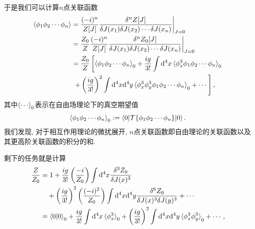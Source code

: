于是我们可以计算$n$点关联函数
\begin{align}
    \braket{\phi_1\phi_2\cdots\phi_n}&=\frac{(-i)^n}{Z[J]}\frac{\delta^n Z[J]}{\delta J(x_1)\delta J(x_2)\cdots\delta J(x_n)}\bigg|_{J=0}\\
    &=\frac{Z_0}{Z}\frac{(-i)^n}{Z[J]}\frac{\delta^n Z_0[J]}{\delta J(x_1)\delta J(x_2)\cdots\delta J(x_n)}\bigg|_{J=0}\\
    &=\frac{Z_0}{Z}\left[\braket{\phi_1\phi_2\cdots\phi_n}_0+\frac{ig}{3!}\int\mathrm d^4x\braket{\phi_x^3\phi_1\phi_2\cdots\phi_n}_0\right.\notag\\
    &\;\left.+\left(\frac{ig}{3!}\right)^2\int\mathrm d^4x\mathrm d^4y\braket{\phi_x^3\phi_y^3\phi_1\phi_2\cdots\phi_n}_0+\cdots\right],
\end{align}
其中$\braket{\cdots}_0$表示在自由场理论下的真空期望值
\begin{equation}
    \braket{\phi_1\phi_2\cdots\phi_n}_0:=\braket{0|\mathcal T\{\phi_1\phi_2\cdots\phi_n\}|0}.
\end{equation}
我们发现, 对于相互作用理论的微扰展开, $n$点关联函数即自由理论的关联函数以及其更高阶关联函数的积分的和.

剩下的任务就是计算
\begin{align}
    \frac{Z}{Z_0}&=1+\frac{ig}{3!}\left(\frac{-i}{Z_0}\right)\int\mathrm d^4x\frac{\delta^3 Z_0}{\delta J(x)^3}\notag\\
    &\quad+\left(\frac{ig}{3!}\right)^2\left(\frac{(-i)^2}{Z_0}\right)\int\mathrm d^4x\mathrm d^4y\frac{\delta^6 Z_0}{\delta J(x)^3 \delta J(y)^3}+\cdots\\
    &=\braket{0|0}_0+\frac{ig}{3!}\int\mathrm d^4x\braket{\phi_x^3}_0+\left(\frac{ig}{3!}\right)^2\int\mathrm d^4x\mathrm d^4y\braket{\phi_x^3\phi_y^3}_0+\cdots,
\end{align}

